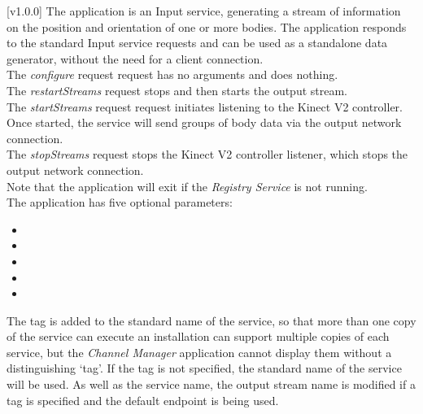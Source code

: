 [v1.0.0]
The  application is an Input service,
generating a stream of information on the position and orientation of one or more bodies.
The application responds to the standard Input service requests and can be used as a
standalone data generator, without the need for a client connection.\\

The \emph{configure} request request has no arguments and does nothing.\\

The \emph{restartStreams} request stops and then starts the output stream.\\

The \emph{startStreams} request request initiates listening to the Kinect V2 controller.
Once started, the service will send groups of body data via the output \yarp{} network
connection.\\

The \emph{stopStreams} request stops the Kinect V2 controller listener, which stops the
output \yarp{} network connection.\\ 

Note that the application will exit if the \emph{Registry Service} is not running.\\

The application has five optional parameters:
\begin{itemize}
\item{}
\item\exSp{}
\item\exSp{}
\item\exSp{}
\item\exSp{}
\end{itemize}
The tag is added to the standard name of the service, so that more than one copy of the
service can execute \longDash{} an \mplusm{} installation can support multiple copies of
each  service, but the \emph{Channel Manager} application cannot display
them without a distinguishing `tag'.
If the tag is not specified, the standard name of the service will be used.
As well as the service name, the output stream name is modified if a tag is specified and
the default endpoint is being used.\\

